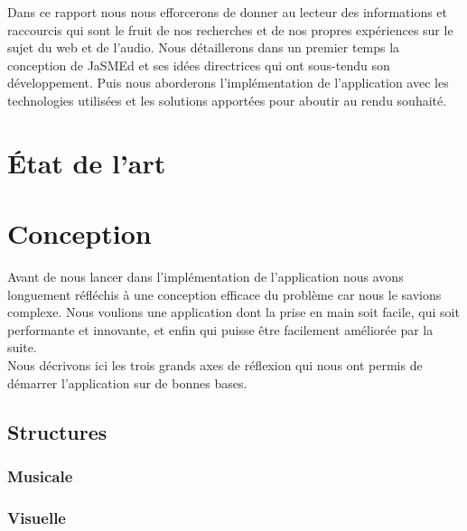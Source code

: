 \documentclass[12pt,a4paper]{article}
\begin{document}
\medskip
Dans ce rapport nous nous efforcerons de donner au lecteur des informations et raccourcis qui sont le fruit de nos recherches et de nos propres expériences sur le sujet du web et de l’audio. Nous détaillerons dans un premier temps la conception de JaSMEd et ses idées directrices qui ont sous-tendu son développement. Puis nous aborderons l’implémentation de l’application avec les technologies utilisées et les solutions apportées pour aboutir au rendu souhaité.

\section{État de l'art}


\section{Conception}

Avant de nous lancer dans l’implémentation de l’application nous avons longuement réfléchis à une conception efficace du problème car nous le savions complexe. Nous voulions une application dont la prise en main soit facile, qui soit performante et innovante, et enfin qui puisse être facilement améliorée par la suite.\\
Nous décrivons ici les trois grands axes de réflexion qui nous ont permis de démarrer l’application sur de bonnes bases.

\subsection{Structures}

\subsubsection{Musicale}

\subsubsection{Visuelle}
\end{document}
